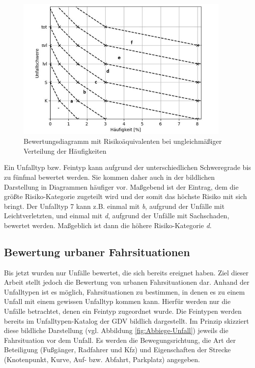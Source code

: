 \begin{savenotes}
	\begin{figure}[H]
		\centering
		\includegraphics[width=10.5cm,height=7cm]{figures/Bewertungsdiagramm(2)}
		\caption[Bewertungsdiagramm mit Risikoäquivalenten bei ungleichmäßiger Verteilung der Häufigkeiten]{Bewertungsdiagramm mit Risikoäquivalenten bei ungleichmäßiger Verteilung der Häufigkeiten}\label{fig:Bewertungsdiagramm(2)}
	\end{figure}
\end{savenotes}

Ein Unfalltyp bzw. Feintyp kann aufgrund der unterschiedlichen Schweregrade bis zu fünfmal bewertet werden. Sie kommen daher auch in der bildlichen Darstellung in Diagrammen häufiger vor. Maßgebend ist der Eintrag, dem die größte Risiko-Kategorie zugeteilt wird und der somit das höchste Risiko mit sich bringt. Der Unfalltyp 7 kann z.B. einmal mit \textit{b}, aufgrund der Unfälle mit Leichtverletzten, und einmal mit \textit{d}, aufgrund der Unfälle mit Sachschaden, bewertet werden. Maßgeblich ist dann die höhere Risiko-Kategorie \textit{d}.

\subsection{Bewertung urbaner Fahrsituationen}\label{subsection:Bewertungs urbaner Fahrsituationen}
Bis jetzt wurden nur Unfälle bewertet, die sich bereits ereignet haben. Ziel dieser Arbeit stellt jedoch die Bewertung von urbanen Fahrsituationen dar. Anhand der Unfalltypen ist es möglich, Fahrsituationen zu bestimmen, in denen es zu einem Unfall mit einem gewissen Unfalltyp kommen kann. Hierfür werden nur die Unfälle betrachtet, denen ein Feintyp zugeordnet wurde. Die Feintypen werden bereits im Unfalltypen-Katalog der GDV bildlich dargestellt. Im Prinzip skizziert diese bildliche Darstellung (vgl. Abbildung \ref{fig:Abbiege-Unfall}) jeweils die Fahrsituation vor dem Unfall. Es werden die Bewegungsrichtung, die Art der Beteiligung (Fußgänger, Radfahrer und Kfz) und Eigenschaften der Strecke (Knotenpunkt, Kurve, Auf- bzw. Abfahrt, Parkplatz) angegeben.

